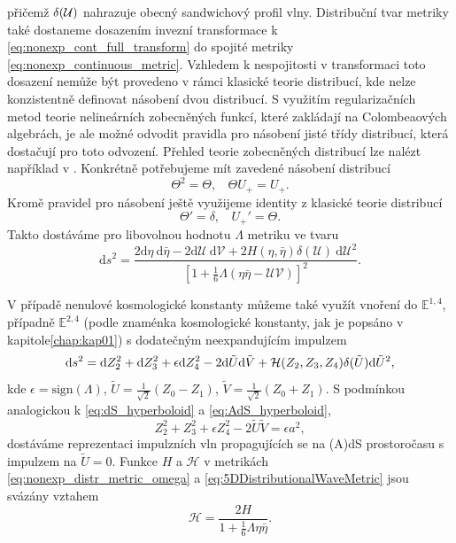 přičemž $\delta(\mathcal{U})$ nahrazuje obecný sandwichový profil vlny.
Distribuční tvar metriky také dostaneme dosazením invezní transformace k \eqref{eq:nonexp_cont_full_transform} do spojité metriky 
\eqref{eq:nonexp_continuous_metric}. Vzhledem k nespojitosti v transformaci toto dosazení nemůže být provedeno
v rámci klasické teorie distribucí, kde nelze konzistentně definovat násobení dvou distribucí. S využitím regularizačních metod teorie
nelineárních zobecněných funkcí, které zakládají na Colombeaových algebrách, je ale možné odvodit pravidla pro násobení
jisté třídy distribucí, která dostačují pro toto odvození. Přehled teorie zobecněných distribucí lze nalézt například v \cite{Steinbauer_book}.
Konkrétně potřebujeme mít zavedené násobení distribucí
\begin{equation}
        \Theta^2 = \Theta, ~~~~ \Theta U_{+} = U_{+}.
\end{equation}
Kromě pravidel pro násobení ještě využijeme identity z klasické teorie distribucí
\begin{equation}
    \Theta' = \delta, ~~~~ U_{+}' = \Theta.
\end{equation}
Takto dostáváme pro libovolnou hodnotu $\Lambda$ metriku ve tvaru
\begin{equation} \label{eq:nonexp_distr_metric_omega}
\mathrm{d}s^2=\frac{2\mathrm{d}\eta~\mathrm{d}\bar{\eta} - 2 \mathrm{d}\mathcal{U}~\mathrm{d}\mathcal{V} + 2H(\eta, \bar{\eta}) \delta(\mathcal{U}) 
~\mathrm{d}\mathcal{U}^2}{\left[1+\frac{1}{6}\Lambda(\eta \bar{\eta}-\mathcal{U}\mathcal{V})\right]^2}.
\end{equation}

V případě nenulové kosmologické konstanty můžeme také využít vnoření do $\mathbb{E}^{1,4}$, případně $\mathbb{E}^{2,4}$ (podle znaménka kosmologické
konstanty, jak je popsáno v kapitole\autoref{chap:kap01}) s dodatečným neexpandujícím impulzem
\begin{equation}
    \label{eq:5DDistributionalWaveMetric}
    \mathrm{d} s^2 = \mathrm{d} Z_2^2 + \mathrm{d} Z_3^2 + \epsilon \mathrm{d} Z_4^2 - 2 \mathrm{d} \tilde{U} \mathrm{d} \tilde{V} + \mathcal{H}(Z_2, Z_3, Z_4) \delta(\tilde{U}) \mathrm{d} \tilde{U}^2,
\end{equation}
kde $\epsilon = \text{sign} (\Lambda)$, $\tilde{U} = \tfrac{1}{\sqrt{2}}(Z_0 - Z_1)$, $\tilde{V}= \tfrac{1}{\sqrt{2}}(Z_0 + Z_1)$.
S podmínkou analogickou k \eqref{eq:dS_hyperboloid} a \eqref{eq:AdS_hyperboloid},
\begin{equation}
    Z_2^2 + Z_3^2 + \epsilon Z_4^2 - 2 \tilde{U} \tilde{V} = \epsilon a^2,
\end{equation}
dostáváme reprezentaci impulzních vln propagujících se na (A)dS prostoročasu s impulzem na $\tilde{U}=0$. 
Funkce $H$ a $\mathcal{H}$ v metrikách \eqref{eq:nonexp_distr_metric_omega} a \eqref{eq:5DDistributionalWaveMetric} jsou svázány vztahem
\begin{equation}
    \mathcal{H} = \frac{2H}{1+\frac{1}{6}\Lambda \eta \bar{\eta}}.
\end{equation}

